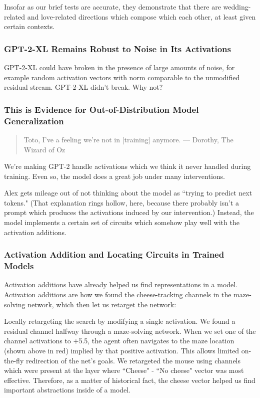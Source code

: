 \documentclass[10pt]{article}
\begin{document}
Insofar as our brief tests are accurate, they demonstrate that there are wedding-related and love-related directions which compose which each other, at least given certain contexts.

\subsubsection{GPT-2-XL Remains Robust to Noise in Its Activations}
GPT-2-XL could have broken in the presence of large amounts of noise, for example random activation vectors with norm comparable to the unmodified residual stream. GPT-2-XL didn't break. Why not? 

\subsubsection{This is Evidence for Out-of-Distribution Model Generalization}
\begin{quote}
Toto, I've a feeling we're not in [training] anymore. — Dorothy, The Wizard of Oz
\end{quote}

We're making GPT-2 handle activations which we think it never handled during training. Even so, the model does a great job under many interventions. 

Alex gets mileage out of not thinking about the model as ``trying to predict next tokens." (That explanation rings hollow, here, because there probably isn't a prompt which produces the activations induced by our intervention.) Instead, the model implements a certain set of circuits which somehow play well with the activation additions.

\subsubsection{Activation Addition and Locating Circuits in Trained Models}
Activation additions have already helped us find representations in a model. Activation additions are how we found the cheese-tracking channels in the maze-solving network, which then let us retarget the network:


Locally retargeting the search by modifying a single activation. We found a residual channel halfway through a maze-solving network. When we set one of the channel activations to $+$5.5, the agent often navigates to the maze location (shown above in red) implied by that positive activation. This allows limited on-the-fly redirection of the net's goals.
We retargeted the mouse using channels which were present at the layer where ``Cheese" - ``No cheese" vector was most effective. Therefore, as a matter of historical fact, the cheese vector helped us find important abstractions inside of a model.
\end{document}
